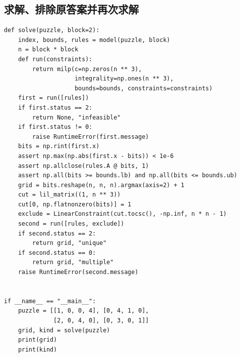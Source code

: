 \documentclass[UTF8,11pt,fontset=none]{ctexart}
\begin{document}
\subsection{求解、排除原答案并再次求解}
\begin{lstlisting}
def solve(puzzle, block=2):
    index, bounds, rules = model(puzzle, block)
    n = block * block
    def run(constraints):
        return milp(c=np.zeros(n ** 3),
                    integrality=np.ones(n ** 3),
                    bounds=bounds, constraints=constraints)
    first = run([rules])
    if first.status == 2:
        return None, "infeasible"
    if first.status != 0:
        raise RuntimeError(first.message)
    bits = np.rint(first.x)
    assert np.max(np.abs(first.x - bits)) < 1e-6
    assert np.allclose(rules.A @ bits, 1)
    assert np.all(bits >= bounds.lb) and np.all(bits <= bounds.ub)
    grid = bits.reshape(n, n, n).argmax(axis=2) + 1
    cut = lil_matrix((1, n ** 3))
    cut[0, np.flatnonzero(bits)] = 1
    exclude = LinearConstraint(cut.tocsc(), -np.inf, n * n - 1)
    second = run([rules, exclude])
    if second.status == 2:
        return grid, "unique"
    if second.status == 0:
        return grid, "multiple"
    raise RuntimeError(second.message)


if __name__ == "__main__":
    puzzle = [[1, 0, 0, 4], [0, 4, 1, 0],
              [2, 0, 4, 0], [0, 3, 0, 1]]
    grid, kind = solve(puzzle)
    print(grid)
    print(kind)
\end{lstlisting}
\end{document}
